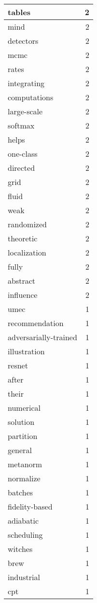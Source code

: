 \begin{table}[h]
\begin{tabular}{|l|r|}
\hline
tables & 2 \\
\hline
mind & 2 \\
\hline
detectors & 2 \\
\hline
mcmc & 2 \\
\hline
rates & 2 \\
\hline
integrating & 2 \\
\hline
computations & 2 \\
\hline
large-scale & 2 \\
\hline
softmax & 2 \\
\hline
helps & 2 \\
\hline
one-class & 2 \\
\hline
directed & 2 \\
\hline
grid & 2 \\
\hline
fluid & 2 \\
\hline
weak & 2 \\
\hline
randomized & 2 \\
\hline
theoretic & 2 \\
\hline
localization & 2 \\
\hline
fully & 2 \\
\hline
abstract & 2 \\
\hline
influence & 2 \\
\hline
umec & 1 \\
\hline
recommendation & 1 \\
\hline
adversarially-trained & 1 \\
\hline
illustration & 1 \\
\hline
resnet & 1 \\
\hline
after & 1 \\
\hline
their & 1 \\
\hline
numerical & 1 \\
\hline
solution & 1 \\
\hline
partition & 1 \\
\hline
general & 1 \\
\hline
metanorm & 1 \\
\hline
normalize & 1 \\
\hline
batches & 1 \\
\hline
fidelity-based & 1 \\
\hline
adiabatic & 1 \\
\hline
scheduling & 1 \\
\hline
witches & 1 \\
\hline
brew & 1 \\
\hline
industrial & 1 \\
\hline
cpt & 1 \\

\end{tabular}
\end{table}
